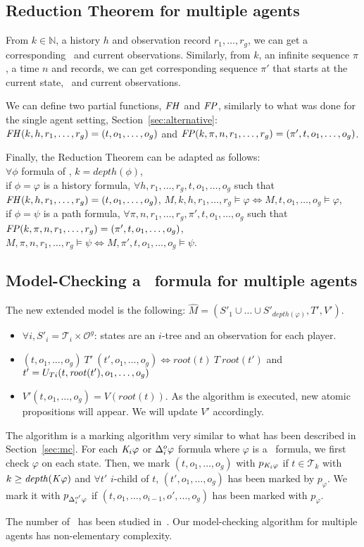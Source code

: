 \subsection{Reduction Theorem for multiple agents}
\label{subsec:reduc}
From $k\in\mathbb{N}$, a history $h$ and observation record $r_1,\dots,r_g$, we can get a corresponding \ktree\ and current observations. Similarly, from $k$, an infinite sequence $\pi$, a time $n$ and records, we can get corresponding sequence $\pi'$ that starts at the current state, \ktree\ and current observations.

We can define two partial functions, $\mathit{FH}$ and $\mathit{FP}$, similarly to what was done for the single agent setting, Section~\ref{sec:alternative}:
$\mathit{FH}(k,h,r_1,\dots,r_g)=(t,o_1,\dots,o_g)$ and 
$\mathit{FP}(k,\pi,n,r_1,\dots,r_g)=(\pi',t,o_1,\dots,o_g)$.

Finally, the Reduction Theorem can be adapted as follows:\\
$\forall\phi$ formula of \ctlskd, $k=\mathit{depth}(\phi)$,\\
if $\phi=\varphi$ is a history formula, $\forall h,r_1,\dots,r_g,t,o_1,\dots,o_g$ such that $\mathit{FH}(k,h,r_1,\dots,r_g)=(t,o_1,\dots,o_g)$, \quad$M,k,h,r_1,\dots,r_g\models\varphi\iff M,t,o_1,\dots,o_g\models\varphi$,\\
if $\phi=\psi$ is a path formula, $\forall \pi,n,r_1,\dots,r_g,\pi',t,o_1,\dots,o_g$ such that $\mathit{FP}(k,\pi,n,r_1,\dots,r_g)=(\pi',t,o_1,\dots,o_g)$, \quad$M,\pi,n,r_1,\dots,r_g\models\psi\iff M,\pi',t,o_1,\dots,o_g\models\psi$.

\subsection{Model-Checking a \ctlskd\ formula for multiple agents}
\label{subsec:mc}
The new extended model is the following: $\hat{M}=(S'_1\cup\dots\cup S'_{\mathit{depth}(\varphi)},T',V')$.
\begin{itemize}
\item $\forall i, S'_i=\mathcal{T}_i\times \mathcal{O}^g$: states are an $i$-tree and an observation for each player.
\item $(t,o_1,\dots,o_g)~T'~(t',o_1,\dots,o_g)\iff \mathit{root}(t)~T~\mathit{root}(t')$ and $t'=U_{T i}(t,\mathit{root}(t'),o_1,\dots,o_g)$
\item $V'(t,o_1,\dots,o_g)=V(\mathit{root}(t))$. As the algorithm is executed, new atomic propositions will appear. We will update $V'$ accordingly.
\end{itemize}
The algorithm is a marking algorithm very similar to what has been described in Section~\ref{sec:mc}. For each $\mathit{K}_i\varphi$ or $\Delta^{o}_i\varphi$ formula where $\varphi$ is a \ctls\ formula, we first check $\varphi$ on each state. Then, we mark $(t,o_1,\dots,o_g)$ with $p_{\mathit{K}_i\varphi}$ if $t\in\mathcal{T}_k$ with $k\geq\mathit{depth}(\mathit{K}\varphi)$ and $\forall t'$ $i$-child of $t$, $(t',o_1,\dots,o_g)$ has been marked by $p_\varphi$. We mark it with $p_{\Delta^{o'}_i\varphi}$ if $(t,o_1,\dots,o_{i-1},o',\dots,o_g)$ has been marked with $p_\varphi$.

The number of \ktrees\ has been studied in~\cite{DBLP:conf/fsttcs/MeydenS99}. Our model-checking algorithm for multiple agents has non-elementary complexity.
